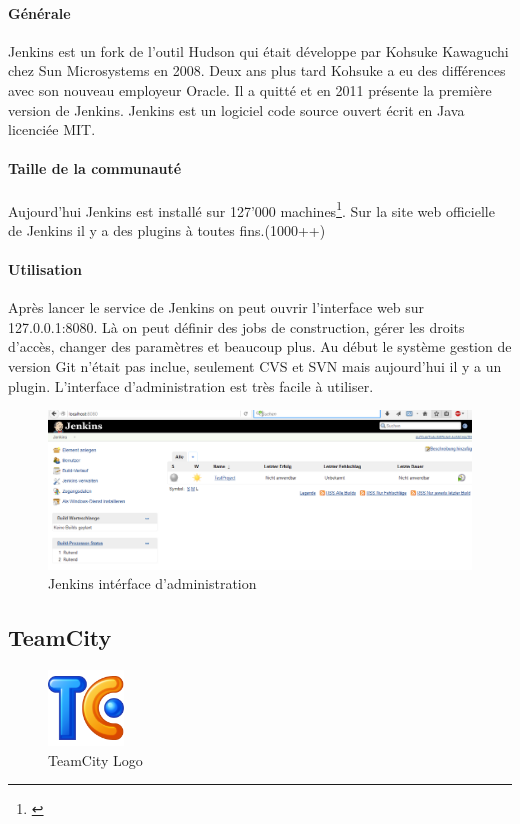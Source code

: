 \paragraph{Générale} Jenkins est un fork de l'outil Hudson qui était développe par Kohsuke Kawaguchi chez Sun Microsystems en 2008. Deux ans plus tard Kohsuke a eu des différences avec son nouveau employeur Oracle. Il a quitté et en 2011 présente la première version de Jenkins. Jenkins est un logiciel code source ouvert écrit en Java licenciée MIT. 
\paragraph{Taille de la communauté} Aujourd'hui Jenkins est installé sur 127'000 machines\footnote{\citep{jenkinsstats}}. Sur la site web officielle de Jenkins il y a des plugins à toutes fins.(1000++) 
\paragraph{Utilisation} Après lancer le service de Jenkins on peut ouvrir l'interface web sur 127.0.0.1:8080. Là on peut définir des jobs de construction, gérer les droits d'accès, changer des paramètres et beaucoup plus. Au début le système gestion de version Git n'était pas inclue, seulement CVS et SVN mais aujourd'hui il y a un plugin. L'interface d'administration est très facile à utiliser.
\begin{figure}[H]
	\centering
		\includegraphics[width=15cm]{bilder/JenkinsGui}
	\caption{Jenkins intérface d'administration}
	\label{fig:jenkinsgui}
\end{figure}

\clearpage


\subsection{TeamCity}
\begin{figure}
  \begin{center}
    \includegraphics[width=0.18\textwidth]{bilder/teamcity512}
  \end{center}
  \caption{TeamCity Logo}
\end{figure}
